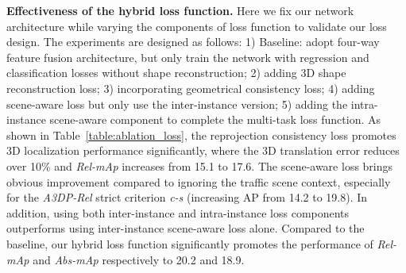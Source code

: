 \documentclass[runningheads]{llncs}
\begin{document}
\smallskip\noindent\textbf{Effectiveness of the hybrid loss function.}
Here we fix our network architecture while varying the components of loss function to validate our loss design. 
The experiments are designed as follows:
1) Baseline: adopt four-way feature fusion architecture, but only train the network with regression and classification losses without shape reconstruction;
2) adding 3D shape reconstruction loss;
3) incorporating geometrical consistency loss;
4) adding scene-aware loss but only use the inter-instance version;
5) adding the intra-instance scene-aware component to complete the multi-task loss function.
As shown in Table~\ref{table:ablation_loss}, the reprojection consistency loss promotes 3D localization performance significantly, where the 3D translation error reduces over 10\% and \textit{Rel-mAp} increases from 15.1 to 17.6. The scene-aware loss brings obvious improvement compared to ignoring the traffic scene context, especially for the \textit{A3DP-Rel} strict criterion \textit{c-s} (increasing AP from 14.2 to 19.8). In addition, using both inter-instance and intra-instance loss components outperforms using inter-instance scene-aware loss alone. Compared to the baseline, our hybrid loss function significantly promotes the performance of \textit{Rel-mAp} and \textit{Abs-mAp} respectively to 20.2 and 18.9.
\end{document}
